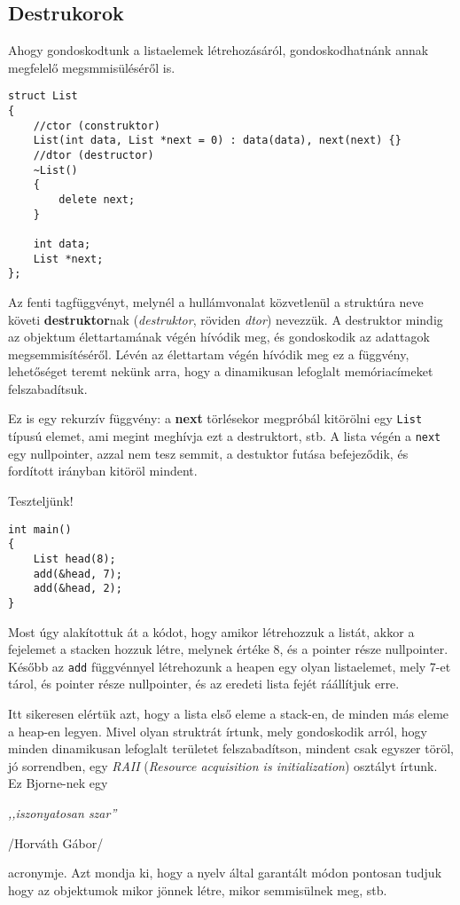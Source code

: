 \documentclass[a4paper,11.5pt,table]{article}
\begin{document}
	\subsection{Destrukorok}
	Ahogy gondoskodtunk a listaelemek létrehozásáról, gondoskodhatnánk annak megfelelő megsmmisüléséről is.
	\begin{lstlisting}
struct List
{
	//ctor (construktor)
	List(int data, List *next = 0) : data(data), next(next) {}
	//dtor (destructor)
	~List()
	{
		delete next;
	}
	
	int data;
	List *next;
};
	\end{lstlisting}
	Az fenti tagfüggvényt, melynél a hullámvonalat közvetlenül a struktúra neve követi \textbf{destruktor}nak (\textit{destruktor}, röviden \textit{dtor}) nevezzük. A destruktor mindig az objektum élettartamának végén hívódik meg, és gondoskodik az adattagok megsemmisítéséről. Lévén az élettartam végén hívódik meg ez a függvény, lehetőséget teremt nekünk arra, hogy a dinamikusan lefoglalt memóriacímeket felszabadítsuk.
	
	\medskip
	Ez is egy rekurzív függvény: a \textbf{next} törlésekor megpróbál kitörölni egy \texttt{List} típusú elemet, ami megint meghívja ezt a destruktort, stb. A lista végén a \texttt{next} egy nullpointer, azzal nem tesz semmit, a destuktor futása befejeződik, és fordított irányban kitöröl mindent.
	
	\medskip
	Teszteljünk!
	\begin{lstlisting}
int main()
{
	List head(8);
	add(&head, 7);
	add(&head, 2);
}
	\end{lstlisting}
	Most úgy alakítottuk át a kódot, hogy amikor létrehozzuk a listát, akkor a fejelemet a stacken hozzuk létre, melynek értéke 8, és a pointer része nullpointer. Később az \texttt{add} függvénnyel létrehozunk a heapen egy olyan listaelemet, mely 7-et tárol, és pointer része nullpointer, és az eredeti lista fejét ráállítjuk erre.
	\medskip
	
	Itt sikeresen elértük azt, hogy a lista első eleme a stack-en, de minden más eleme a heap-en legyen. Mivel olyan struktrát írtunk, mely gondoskodik arról, hogy minden dinamikusan lefoglalt területet felszabadítson, mindent csak egyszer töröl, jó sorrendben, egy  \textit{RAII} (\textit{Resource acquisition is initialization}) osztályt írtunk. Ez Bjorne-nek egy
	\begin{center}
		\textit{,,iszonyatosan szar''}
		
		/Horváth Gábor/
	\end{center}
	acronymje. Azt mondja ki, hogy a nyelv által garantált módon pontosan tudjuk hogy az objektumok mikor jönnek létre, mikor semmisülnek meg, stb.
	
\end{document}
